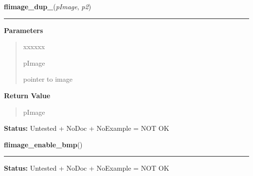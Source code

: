 \hspace{.8\funcindent}\begin{boxedminipage}{\funcwidth}

    \raggedright \textbf{flimage\_dup\_}(\textit{pImage}, \textit{p2})

    \vspace{-1.5ex}

    \rule{\textwidth}{0.5\fboxrule}
\setlength{\parskip}{2ex}
\setlength{\parskip}{1ex}
      \textbf{Parameters}
      \vspace{-1ex}

      \begin{quote}
        \begin{Ventry}{xxxxxx}

          \item[pImage]

          pointer to image

        \end{Ventry}

      \end{quote}

      \textbf{Return Value}
    \vspace{-1ex}

      \begin{quote}
      pImage

      \end{quote}

\textbf{Status:} Untested + NoDoc + NoExample = NOT OK



    \end{boxedminipage}

    \label{xformslib:library:flimage_enable_bmp}

    \vspace{0.5ex}

\hspace{.8\funcindent}\begin{boxedminipage}{\funcwidth}

    \raggedright \textbf{flimage\_enable\_bmp}()

    \vspace{-1.5ex}

    \rule{\textwidth}{0.5\fboxrule}
\setlength{\parskip}{2ex}
\setlength{\parskip}{1ex}
\textbf{Status:} Untested + NoDoc + NoExample = NOT OK



    \end{boxedminipage}

